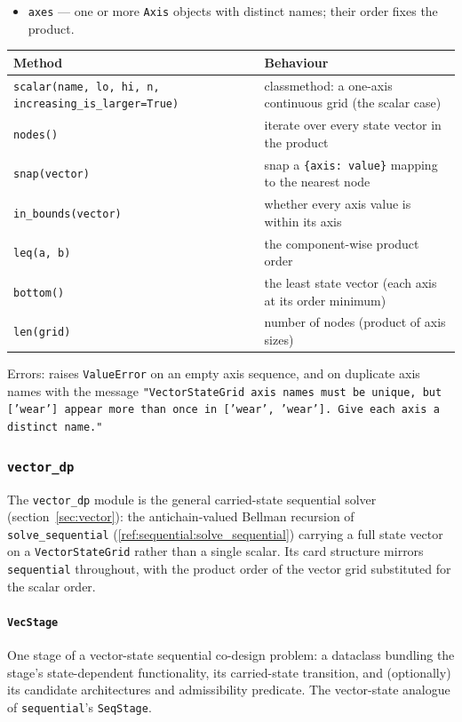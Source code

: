 \documentclass[11pt,a4paper]{article}
\begin{document}
\begin{itemize}[nosep]
  \item \texttt{axes} --- one or more \texttt{Axis} objects with distinct
    names; their order fixes the product.
\end{itemize}

\begin{center}
\begin{tabular}{@{}p{}p{}@{}}
\toprule
Method & Behaviour \\
\midrule
\texttt{scalar(name, lo, hi, n, increasing\_is\_larger=True)} &
  classmethod: a one-axis continuous grid (the scalar case) \\
\texttt{nodes()}        & iterate over every state vector in the product \\
\texttt{snap(vector)}   & snap a \texttt{\{axis: value\}} mapping to the
  nearest node \\
\texttt{in\_bounds(vector)} & whether every axis value is within its axis \\
\texttt{leq(a, b)}      & the component-wise product order \\
\texttt{bottom()}       & the least state vector (each axis at its order
  minimum) \\
\texttt{len(grid)}      & number of nodes (product of axis sizes) \\
\bottomrule
\end{tabular}
\end{center}
Errors: raises \texttt{ValueError} on an empty axis sequence, and on
duplicate axis names with the message
\texttt{"VectorStateGrid axis names must be unique, but ['wear'] appear more
than once in ['wear', 'wear']. Give each axis a distinct name."}

\subsubsection{\texttt{vector\_dp}}
\label{ref:vector_dp}

The \texttt{vector\_dp} module is the general carried-state sequential
solver (section~\ref{sec:vector}): the antichain-valued Bellman recursion of
\texttt{solve\_sequential} (\ref{ref:sequential:solve_sequential}) carrying a
full state vector on a \texttt{VectorStateGrid} rather than a single scalar.
Its card structure mirrors \texttt{sequential} throughout, with the product
order of the vector grid substituted for the scalar order.

\paragraph{\texttt{VecStage}}\label{ref:vector_dp:vecstage}
One stage of a vector-state sequential co-design problem: a dataclass
bundling the stage's state-dependent functionality, its carried-state
transition, and (optionally) its candidate architectures and admissibility
predicate. The vector-state analogue of \texttt{sequential}'s
\texttt{SeqStage}.
\end{document}
